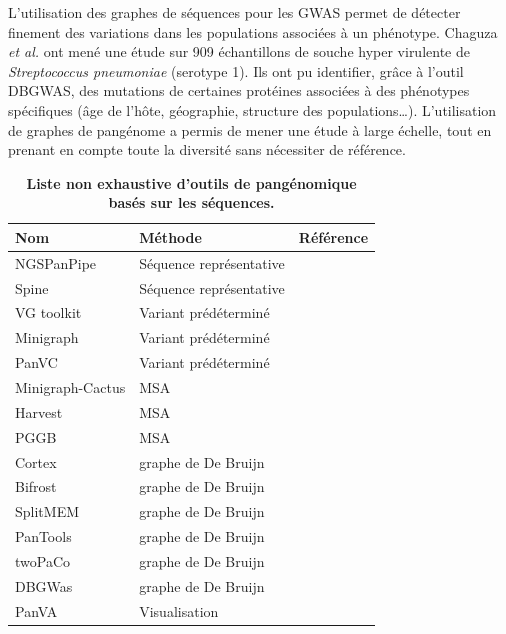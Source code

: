 L'utilisation des graphes de séquences pour les GWAS permet de détecter finement des variations dans les populations associées à un phénotype. Chaguza \textit{et al.} \cite{chaguza_bacterial_2020} ont mené une étude sur 909 échantillons de souche hyper virulente de \textit{Streptococcus pneumoniae} (serotype 1). Ils ont pu identifier, grâce à l'outil DBGWAS, des mutations de certaines protéines associées à des phénotypes spécifiques (âge de l'hôte, géographie, structure des populations\dots). L'utilisation de graphes de pangénome a permis de mener une étude à large échelle, tout en prenant en compte toute la diversité sans nécessiter de référence.

\begin{table}[htbp]
    \centering
    \begin{tabular}{|p{}|p{}|p{}|}
        \hline
        Nom & Méthode & Référence \\
        \hline
        NGSPanPipe & Séquence représentative & \cite{kulsum_ngspanpipe_2018} \\
        \hline
        Spine & Séquence représentative & \cite{ozer_characterization_2014}\\
        \hline
        VG toolkit & Variant prédéterminé & \cite{garrison_variation_2018} \\
        \hline
        Minigraph & Variant prédéterminé & \cite{li_design_2020} \\
        \hline
        PanVC & Variant prédéterminé & \cite{norri_founder_2021} \\
        \hline
        Minigraph-Cactus & MSA & \cite{hickey_pangenome_2024}\\
        \hline
        Harvest & MSA & \cite{treangen_harvest_2014} \\
        \hline
        PGGB & MSA & \cite{garrison_building_2024}\\
        \hline
        Cortex & graphe de De Bruijn & \cite{iqbal_novo_2012} \\
        \hline
        Bifrost & graphe de De Bruijn & \cite{holley_bifrost_2020} \\
        \hline
        SplitMEM & graphe de De Bruijn & \cite{marcus_splitmem_2014} \\
        \hline
        PanTools & graphe de De Bruijn & \cite{sheikhizadeh_pantools_2016} \\
        \hline
        twoPaCo & graphe de De Bruijn & \cite{minkin_twopaco_2017}\\
        \hline
        DBGWas & graphe de De Bruijn & \cite{jaillard_fast_2018}\\
        \hline
        PanVA & Visualisation & \cite{van_den_brandt_panva_2024} \\
        \hline
        
    \end{tabular}
    \caption[Outils de pangénomique basés sur les séquences]{\textbf{Liste non exhaustive d'outils de pangénomique basés sur les séquences.}}
    \label{tab:pangenomicToolsSeq}
\end{table}